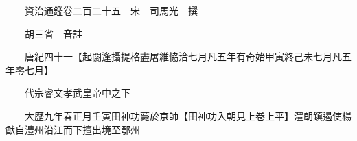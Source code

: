 










 


 
 


 

  
  
  
  
  





  
  
  
  
  
 
  

  

  
  
  



  

 
 

  
   




  

  
  


  　　資治通鑑卷二百二十五　宋　司馬光　撰

　　胡三省　音註

　　唐紀四十一【起閼逢攝提格盡屠維恊洽七月凡五年有奇始甲寅終己未七月凡五年零七月】

　　代宗睿文孝武皇帝中之下

　　大歷九年春正月壬寅田神功薨於京師【田神功入朝見上卷上平】澧朗鎮遏使楊猷自澧州沿江而下擅出境至鄂州

